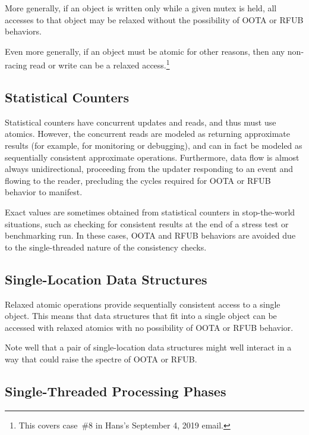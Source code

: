 \documentclass{article}
\begin{document}
More generally, if an object is written only while a given mutex is
held, all accesses to that object may be relaxed without the possibility
of OOTA or RFUB behaviors.

Even more generally, if an object must be atomic for other reasons, then
any non-racing read or write can be a relaxed access.\footnote{
	This covers case~\#8 in Hans's September 4, 2019 email.}

\subsection{Statistical Counters}
\label{sec:Statistical Counters}

Statistical counters have concurrent updates and reads, and thus must
use atomics.
However, the concurrent reads are modeled as returning approximate results
(for example, for monitoring or debugging),
and can in fact be modeled as sequentially consistent approximate
operations.
Furthermore, data flow is almost always unidirectional, proceeding from
the updater responding to an event and flowing to the reader, precluding
the cycles required for OOTA or RFUB behavior to manifest.

Exact values are sometimes obtained from statistical counters in
stop-the-world situations, such as checking for consistent results
at the end of a stress test or benchmarking run.
In these cases, OOTA and RFUB behaviors are avoided due to the
single-threaded nature of the consistency checks.

\subsection{Single-Location Data Structures}
\label{sec:Single-Location Data Structures}

Relaxed atomic operations provide sequentially consistent access to
a single object.
This means that data structures that fit into a single object can
be accessed with relaxed atomics with no possibility of OOTA or
RFUB behavior.

Note well that a pair of single-location data structures might well
interact in a way that could raise the spectre of OOTA or RFUB.

\subsection{Single-Threaded Processing Phases}
\label{sec:Single-Threaded Processing Phases}
\end{document}
